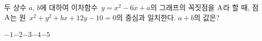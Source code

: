 두 상수 $a$, $b$에 대하여 이차함수~$y=x^2-6x+a$의 그래프의 꼭짓점을 $\mathrm{A}$라 할 때, 점~$\mathrm{A}$는 원~$x^2+y^2+bx+12y-10=0$의 중심과 일치한다. $a+b$의 값은?
\begin{choices32}{$-1$}{$-2$}{$-3$}{$-4$}{$-5$}\end{choices32}
